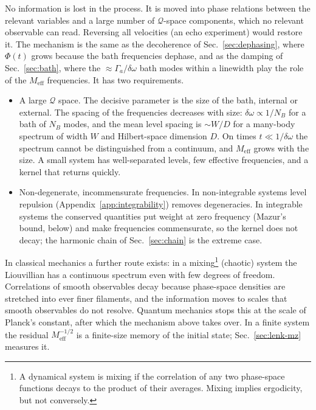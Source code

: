 \documentclass[10pt,a4paper]{article}
\newcommand{\QQ}{\mathcal{Q}}
\begin{document}
No information is lost in the process.
It is moved into phase relations between the relevant variables and a large number of $ \QQ $-space components, which no relevant observable can read.
Reversing all velocities (an echo experiment) would restore it.
The mechanism is the same as the decoherence of Sec.~\ref{sec:dephasing}, where $ \Phi(t) $ grows because the bath frequencies dephase, and as the damping of Sec.~\ref{sec:bath}, where the $ \approx \Gamma_a/\delta\omega $ bath modes within a linewidth play the role of the $ M_{\mathrm{eff}} $ frequencies.
It has two requirements.
\begin{itemize}[leftmargin=1.5em]
\item A large $ \QQ $ space. The decisive parameter is the size of the bath, internal or external. The spacing of the frequencies decreases with size: $ \delta\omega \propto 1/N_B $ for a bath of $ N_B $ modes, and the mean level spacing is $ \sim W/D $ for a many-body spectrum of width $ W $ and Hilbert-space dimension $ D $. On times $ t \ll 1/\delta\omega $ the spectrum cannot be distinguished from a continuum, and $ M_{\mathrm{eff}} $ grows with the size. A small system has well-separated levels, few effective frequencies, and a kernel that returns quickly.
\item Non-degenerate, incommensurate frequencies. In non-integrable systems level repulsion (Appendix~\ref{app:integrability}) removes degeneracies. In integrable systems the conserved quantities put weight at zero frequency (Mazur's bound, below) and make frequencies commensurate, so the kernel does not decay; the harmonic chain of Sec.~\ref{sec:chain} is the extreme case.
\end{itemize}
In classical mechanics a further route exists: in a mixing\footnote{A dynamical system is mixing if the correlation of any two phase-space functions decays to the product of their averages. Mixing implies ergodicity, but not conversely.} (chaotic) system the Liouvillian has a continuous spectrum even with few degrees of freedom. Correlations of smooth observables decay because phase-space densities are stretched into ever finer filaments, and the information moves to scales that smooth observables do not resolve. Quantum mechanics stops this at the scale of Planck's constant, after which the mechanism above takes over.
In a finite system the residual $ M_{\mathrm{eff}}^{-1/2} $ is a finite-size memory of the initial state; Sec.~\ref{sec:lenk-mz} measures it.
\end{document}
